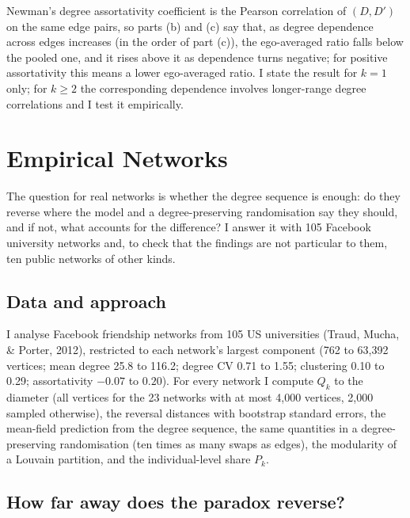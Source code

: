 \documentclass{nws}
\begin{document}
Newman's degree assortativity coefficient is the Pearson correlation of
$(D,D')$ on the same edge pairs, so parts (b) and (c) say that, as degree dependence across edges increases (in the order of part (c)), the ego-averaged ratio falls below the pooled one, and it rises above it as dependence turns negative; for positive assortativity this means a lower ego-averaged ratio. I state the
result for $k=1$ only; for $k\ge2$ the corresponding dependence involves
longer-range degree correlations and I test it empirically.


\section{Empirical Networks}

The question for real networks is whether the degree sequence is enough: do they reverse where the model and a degree-preserving randomisation say they should, and if not, what accounts for the difference? I answer it with 105 Facebook university networks and, to check that the findings are not particular to them, ten public networks of other kinds.

\subsection{Data and approach}

I analyse Facebook friendship networks from 105 US universities (Traud, Mucha, \&
Porter, 2012), restricted to each network's largest component (762 to 63{,}392
vertices; mean degree 25.8 to 116.2; degree CV 0.71 to 1.55; clustering 0.10 to
0.29; assortativity $-0.07$ to $0.20$). For every network I compute $Q_k$ to the
diameter (all vertices for the 23 networks with at most 4{,}000 vertices, 2{,}000
sampled otherwise), the reversal distances with bootstrap standard errors, the
mean-field prediction from the degree sequence, the same quantities in a
degree-preserving randomisation (ten times as many swaps as edges), the modularity
of a Louvain partition, and the individual-level share $P_k$.

\subsection{How far away does the paradox reverse?}
\end{document}
